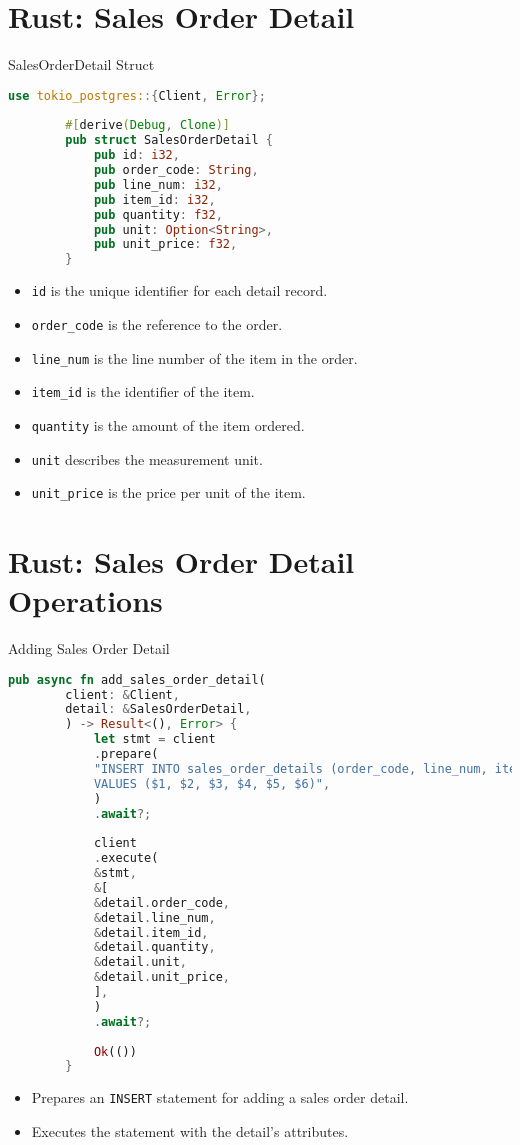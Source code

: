 \documentclass[aspectratio=169, table]{beamer}
\begin{document}
\section{Rust: Sales Order Detail}

\begin{frame}[fragile]{SalesOrderDetail Struct}
	\begin{lstlisting}[language=Rust]
		use tokio_postgres::{Client, Error};
		
		#[derive(Debug, Clone)]
		pub struct SalesOrderDetail {
			pub id: i32,
			pub order_code: String,
			pub line_num: i32,
			pub item_id: i32,
			pub quantity: f32,
			pub unit: Option<String>,
			pub unit_price: f32,
		}
	\end{lstlisting}
	\begin{itemize}
		\item \texttt{id} is the unique identifier for each detail record.
		\item \texttt{order\_code} is the reference to the order.
		\item \texttt{line\_num} is the line number of the item in the order.
		\item \texttt{item\_id} is the identifier of the item.
		\item \texttt{quantity} is the amount of the item ordered.
		\item \texttt{unit} describes the measurement unit.
		\item \texttt{unit\_price} is the price per unit of the item.
	\end{itemize}
\end{frame}

\section{Rust: Sales Order Detail Operations}

\begin{frame}[fragile]{Adding Sales Order Detail}
	\begin{lstlisting}[language=Rust]
		pub async fn add_sales_order_detail(
		client: &Client,
		detail: &SalesOrderDetail,
		) -> Result<(), Error> {
			let stmt = client
			.prepare(
			"INSERT INTO sales_order_details (order_code, line_num, item_id, quantity, unit, unit_price)
			VALUES ($1, $2, $3, $4, $5, $6)",
			)
			.await?;
			
			client
			.execute(
			&stmt,
			&[
			&detail.order_code,
			&detail.line_num,
			&detail.item_id,
			&detail.quantity,
			&detail.unit,
			&detail.unit_price,
			],
			)
			.await?;
			
			Ok(())
		}
	\end{lstlisting}
	\begin{itemize}
		\item Prepares an \texttt{INSERT} statement for adding a sales order detail.
		\item Executes the statement with the detail's attributes.
	\end{itemize}
\end{frame}
\end{document}
